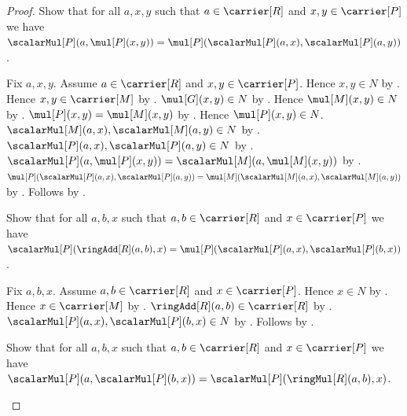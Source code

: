 \begin{proof}
    Show that for all $a,x,y$ such that $a\in\carrier[R]$ and
        $x,y\in\carrier[P]$ we have
        $\scalarMul[P](a,\mul[P](x,y))
            =\mul[P](\scalarMul[P](a,x),\scalarMul[P](a,y))$.
    \begin{subproof}
        Fix $a,x,y$.
        Assume $a\in\carrier[R]$ and $x,y\in\carrier[P]$.
        Hence $x,y\in N$ by .
        Hence $x,y\in\carrier[M]$ by .
        $\mul[G](x,y)\in N$ by .
        Hence $\mul[M](x,y)\in N$ by
            .
        $\mul[P](x,y)=\mul[M](x,y)$ by
            .
        Hence $\mul[P](x,y)\in N$.
        $\scalarMul[M](a,x),\scalarMul[M](a,y)\in N$ by
            .
        $\scalarMul[P](a,x),\scalarMul[P](a,y)\in N$ by
            .
        $\scalarMul[P](a,\mul[P](x,y))
            =\scalarMul[M](a,\mul[M](x,y))$ by
            .
        $\mul[P](\scalarMul[P](a,x),\scalarMul[P](a,y))
            =\mul[M](\scalarMul[M](a,x),\scalarMul[M](a,y))$ by
            .
        Follows by .
    \end{subproof}
    Show that for all $a,b,x$ such that $a,b\in\carrier[R]$ and
        $x\in\carrier[P]$ we have
        $\scalarMul[P](\ringAdd[R](a,b),x)
            =\mul[P](\scalarMul[P](a,x),\scalarMul[P](b,x))$.
    \begin{subproof}
        Fix $a,b,x$.
        Assume $a,b\in\carrier[R]$ and $x\in\carrier[P]$.
        Hence $x\in N$ by .
        Hence $x\in\carrier[M]$ by .
        $\ringAdd[R](a,b)\in\carrier[R]$ by .
        $\scalarMul[P](a,x),\scalarMul[P](b,x)\in N$ by
            .
        Follows by
            .
    \end{subproof}
    Show that for all $a,b,x$ such that $a,b\in\carrier[R]$ and
        $x\in\carrier[P]$ we have
        $\scalarMul[P](a,\scalarMul[P](b,x))
            =\scalarMul[P](\ringMul[R](a,b),x)$.
    \begin{subproof}

\end{subproof}
\end{proof}
